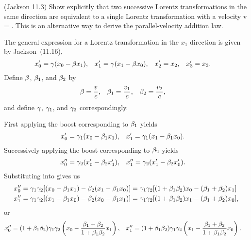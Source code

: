 \newcommand{\vq}{v_1}
\newcommand{\vw}{v_2}

\begin{statement}{(Jackson 11.3)}
	Show explicitly that two successive Lorentz transformations in the same direction are equivalent to a single Lorentz transformation with a velocity
	\beq
		v = \frac{\vq + \vw}{1 + \vq \vw / c^2}.
	\eeq
	This is an alternative way to derive the parallel-velocity addition law.
\end{statement}

\newcommand{\xo}{x_0}
\newcommand{\xq}{x_1}
\newcommand{\xw}{x_2}
\newcommand{\xe}{x_3}

\newcommand{\betq}{\bet_1}
\newcommand{\betw}{\bet_2}
\newcommand{\gamq}{\gam_1}
\newcommand{\gamw}{\gam_2}

\begin{solution}
	The general expression for a Lorentz transformation in the $\xq$ direction is given by Jackson~(11.16),
	\begin{align*}
		\xo' &= \gam (\xo - \bet \xq), &
		\xq' &= \gam (\xq - \bet \xo), &
		\xw' &= \xw, &
		\xe' &= \xe.
	\end{align*}
	Define $\beta$, $\betq$, and $\betw$ by
	\begin{align*}
		\bet &= \frac{v}{c}, &
		\betq &= \frac{\vq}{c}, &
		\betw &= \frac{\vw}{c},
	\end{align*}
	and define $\gamma$, $\gamq$, and $\gamw$ correspondingly.
	
	First applying the boost corresponding to $\betq$ yields
	\begin{align} \label{boost1}
		\xo' &= \gamq (\xo - \betq \xq), &
		\xq' &= \gamq (\xq - \betq \xo).
	\end{align}
	Successively applying the boost corresponding to $\betw$ yields
	\begin{align} \label{boost2}
		\xo'' &= \gamw (\xo' - \betw \xq'), &
		\xq'' &= \gamw (\xq' - \betw \xo').
	\end{align}
	Substituting  into  gives us
	\begin{align*}
		\xo'' &= \gamq \gamw [(\xo - \betq \xq) - \betw (\xq - \betq \xo)]
		= \gamq \gamw [(1 + \betq \betw) \xo - (\betq + \betw) \xq] \\
		\xq'' &= \gamq \gamw [(\xq - \betq \xo) - \betw (\xo - \betq \xq)]
		= \gamq \gamw [(1 + \betq \betw) \xq - (\betq + \betw) \xo],
	\end{align*}
	or
	\begin{align} \label{thing1}
		\xo'' &= (1 + \betq \betw) \gamq \gamw \left( \xo - \frac{\betq + \betw}{1 + \betq \betw} \xq \right), &
		\xq'' &= (1 + \betq \betw) \gamq \gamw \left( \xq - \frac{\betq + \betw}{1 + \betq \betw} \xo \right).
	\end{align}
	

\end{solution}
